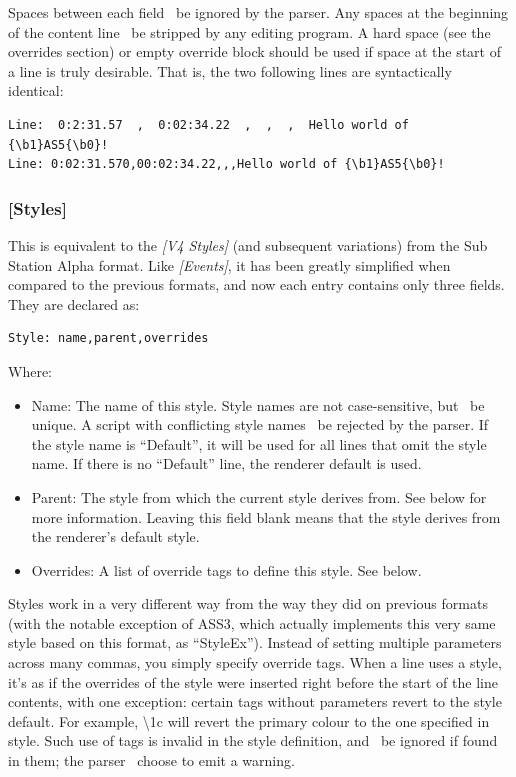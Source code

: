 \documentclass{spec}
\begin{document}
Spaces between each field \must\ be ignored by the parser. Any spaces at the beginning of the
content line \should\ be stripped by any editing program. A hard space (see the overrides section) or empty
override block should be used if space at the start of a line is truly desirable. That is, the two
following lines are syntactically identical:

\begin{verbatim}
Line:  0:2:31.57  ,  0:02:34.22  ,  ,  ,  Hello world of {\b1}AS5{\b0}!
Line: 0:02:31.570,00:02:34.22,,,Hello world of {\b1}AS5{\b0}!
\end{verbatim}


\subsubsection{[Styles]}

This is equivalent to the \emph{[V4 Styles]} (and subsequent variations) from the Sub Station Alpha format.
Like \emph{[Events]}, it has been greatly simplified when compared to the previous formats, and now
each entry contains only three fields. They are declared as:

\begin{verbatim}
Style: name,parent,overrides
\end{verbatim}

Where:

\begin{itemize}
\item Name: The name of this style. Style names are not case-sensitive, but \must\ be unique. A
script with conflicting style names \must\ be rejected by the parser. If the style name is ``Default'', it
will be used for all lines that omit the style name. If there is no ``Default'' line, the renderer
default is used.
\item Parent: The style from which the current style derives from. See below for more information.
Leaving this field blank means that the style derives from the renderer's default style.
\item Overrides: A list of override tags to define this style. See below.
\end{itemize}

Styles work in a very different way from the way they did on previous formats (with the notable exception
of ASS3, which actually implements this very same style based on this format, as ``StyleEx'').
Instead of setting multiple parameters across many commas, you simply specify override tags. When a line
uses a style, it's as if the overrides of the style were inserted right before the start of the line
contents, with one exception: certain tags without parameters revert to the style default. For example,
\textbackslash 1c will revert the primary colour to the one specified in style. Such use of tags is invalid
in the style definition, and \must\ be ignored if found in them; the parser \may\ choose to emit a warning.
\end{document}
